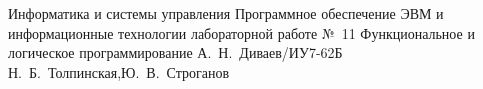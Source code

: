 \documentclass[a4paper,oneside,14pt]{extarticle}
\begin{document}
\makereporttitle
    {Информатика и системы управления} %
    {Программное обеспечение ЭВМ и информационные технологии} %
    {лабораторной работе №~11} %
    {Функциональное и логическое программирование} %
    {} %
    {} %
    {А.~Н.~Диваев/ИУ7-62Б} %
    {Н.~Б.~Толпинская,Ю.~В.~Строганов} %

\setcounter{page}{2}





\end{document}
